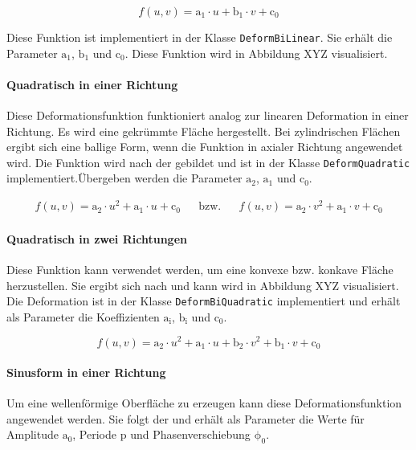 \begin{equation}\label{eq:bilinear}
f(u,v) = \mathrm{a_1}\cdot u+ \mathrm{b_1}\cdot v+\mathrm{c_0}
\end{equation} 

Diese Funktion ist implementiert in der Klasse \verb|DeformBiLinear|. Sie erhält die Parameter $\mathrm{a_1}$, $\mathrm{b_1}$ und $\mathrm{c_0}$. Diese Funktion wird in Abbildung XYZ visualisiert.

\paragraph{Quadratisch in einer Richtung} Diese Deformationsfunktion funktioniert analog zur linearen Deformation in einer Richtung. Es wird eine gekrümmte Fläche hergestellt. Bei zylindrischen Flächen ergibt sich eine ballige Form, wenn die Funktion in axialer Richtung angewendet wird. Die Funktion wird nach der  gebildet und ist in der Klasse \verb|DeformQuadratic| implementiert.Übergeben werden die Parameter $\mathrm{a_2}$, $\mathrm{a_1}$ und $\mathrm{c_0}$.  

\begin{equation}\label{eq:quadratic}
	\begin{aligned}
		f(u,v) = \mathrm{a_2}\cdot u^2+ \mathrm{a_1}\cdot u+\mathrm{c_0}&&\mathrm{bzw.}&&f(u,v) = \mathrm{a_2}\cdot v^2+ \mathrm{a_1}\cdot v+\mathrm{c_0} 
	\end{aligned}
\end{equation}  

\paragraph{Quadratisch in zwei Richtungen} Diese Funktion kann verwendet werden, um eine konvexe bzw. konkave Fläche herzustellen. Sie ergibt sich nach  und kann wird in Abbildung XYZ visualisiert. Die Deformation ist in der Klasse \verb|DeformBiQuadratic| implementiert und erhält als Parameter die Koeffizienten $\mathrm{a_i}$, $\mathrm{b_i}$ und $\mathrm{c_0}$.

\begin{equation}\label{eq:biquadratic}
 f(u,v) = \mathrm{a_2}\cdot u^2+ \mathrm{a_1}\cdot u+\mathrm{b_2}\cdot v^2+ \mathrm{b_1}\cdot v+\mathrm{c_0}
\end{equation}  

\paragraph{Sinusform in einer Richtung} Um eine wellenförmige Oberfläche zu erzeugen kann diese Deformationsfunktion angewendet werden. Sie folgt der  und erhält als Parameter die Werte für Amplitude $\mathrm{a_0}$, Periode $\mathrm{p}$ und Phasenverschiebung $\mathrm{\phi_0}$. 

